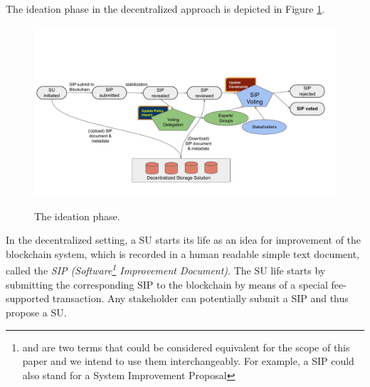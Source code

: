 
The ideation phase in the decentralized approach is depicted in Figure \ref{ideation}.
\begin{figure}[h!] %
    \caption{The ideation phase.}
    \centering
    \includegraphics[width=1.0 \columnwidth,keepaspectratio]{figures/ideation_phase.pdf}
    \label{ideation}
\end{figure}
In the decentralized setting, a SU starts its life as an idea for improvement of the blockchain system, which is recorded in a human readable simple text document, called the \emph{SIP (Software\footnote{ and  are two terms that could be considered equivalent for the scope of this paper and we intend to use them interchangeably. For example, a SIP could also stand for a System Improvement Proposal} Improvement Document)}. The SU life starts by submitting the corresponding SIP to the blockchain by means of a special fee-supported transaction. Any stakeholder can potentially submit a SIP and thus propose a SU. 

